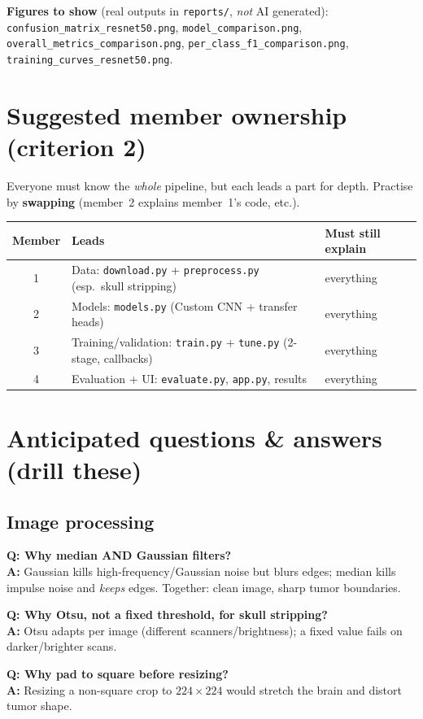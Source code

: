 \documentclass[11pt,a4paper]{article}
\newcommand{\code}[1]{\colorbox{codebg}{\small\texttt{#1}}}
\newcommand{\Q}[1]{\textbf{\color{navy}Q: #1}\\}
\newcommand{\A}[1]{\textbf{\color{ok}A:} #1}
\begin{document}
\textbf{Figures to show} (real outputs in \texttt{reports/}, \emph{not} AI generated):
\texttt{confusion\_matrix\_resnet50.png}, \texttt{model\_comparison.png}, \texttt{overall\_metrics\_comparison.png},
\texttt{per\_class\_f1\_comparison.png}, \texttt{training\_curves\_resnet50.png}.

\section{Suggested member ownership (criterion 2)}
Everyone must know the \emph{whole} pipeline, but each leads a part for depth. Practise by \textbf{swapping}
(member~2 explains member~1's code, etc.).

\begin{center}
\begin{tabularx}{\textwidth}{@{}c l X@{}}
\toprule
\textbf{Member} & \textbf{Leads} & \textbf{Must still explain} \\
\midrule
1 & Data: \code{download.py} + \code{preprocess.py} (esp.\ skull stripping) & everything \\
2 & Models: \code{models.py} (Custom CNN + transfer heads) & everything \\
3 & Training/validation: \code{train.py} + \code{tune.py} (2-stage, callbacks) & everything \\
4 & Evaluation + UI: \code{evaluate.py}, \code{app.py}, results & everything \\
\bottomrule
\end{tabularx}
\end{center}

\section{Anticipated questions \& answers (drill these)}

\subsection*{Image processing}
\begin{qabox}
\Q{Why median AND Gaussian filters?}
\A{Gaussian kills high-frequency/Gaussian noise but blurs edges; median kills impulse noise and \emph{keeps} edges. Together: clean image, sharp tumor boundaries.}
\end{qabox}
\begin{qabox}
\Q{Why Otsu, not a fixed threshold, for skull stripping?}
\A{Otsu adapts per image (different scanners/brightness); a fixed value fails on darker/brighter scans.}
\end{qabox}
\begin{qabox}
\Q{Why pad to square before resizing?}
\A{Resizing a non-square crop to $224\times224$ would stretch the brain and distort tumor shape.}
\end{qabox}
\end{document}
